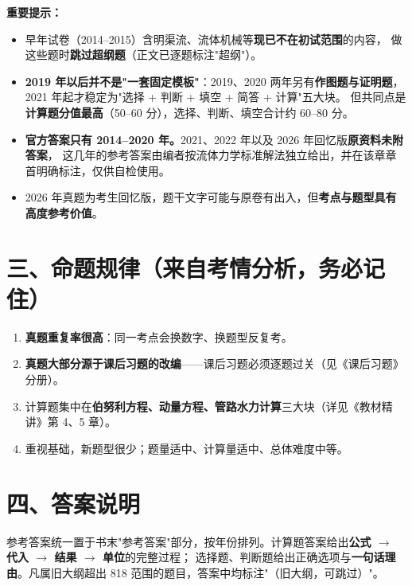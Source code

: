 \noindent\textbf{重要提示：}
\begin{itemize}
  \item 早年试卷（2014--2015）含明渠流、流体机械等\textbf{现已不在初试范围}的内容，
        做这些题时\textbf{跳过超纲题}（正文已逐题标注"超纲"）。
  \item \textbf{2019 年以后并不是"一套固定模板"}：2019、2020 两年另有\textbf{作图题与证明题}，
        2021 年起才稳定为"选择 + 判断 + 填空 + 简答 + 计算"五大块。
        但共同点是\textbf{计算题分值最高}（50--60 分），选择、判断、填空合计约 60--80 分。
  \item \textbf{官方答案只有 2014--2020 年。}2021、2022 年以及 2026 年回忆版\textbf{原资料未附答案}，
        这几年的参考答案由编者按流体力学标准解法独立给出，并在该章章首明确标注，仅供自检使用。
  \item 2026 年真题为考生回忆版，题干文字可能与原卷有出入，但\textbf{考点与题型具有高度参考价值}。
\end{itemize}

\section*{三、命题规律（来自考情分析，务必记住）}

\begin{enumerate}
  \item \textbf{真题重复率很高}：同一考点会换数字、换题型反复考。
  \item \textbf{真题大部分源于课后习题的改编}——课后习题必须逐题过关（见《课后习题》分册）。
  \item 计算题集中在\textbf{伯努利方程、动量方程、管路水力计算}三大块（详见《教材精讲》第 4、5 章）。
  \item 重视基础，新题型很少；题量适中、计算量适中、总体难度中等。
\end{enumerate}

\section*{四、答案说明}

参考答案统一置于书末"参考答案"部分，按年份排列。计算题答案给出\textbf{公式 $\to$ 代入 $\to$ 结果 $\to$ 单位}的完整过程；
选择题、判断题给出正确选项与\textbf{一句话理由}。凡属旧大纲超出 818 范围的题目，答案中均标注"（旧大纲，可跳过）"。
